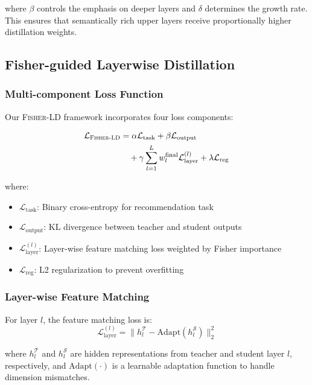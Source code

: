 \documentclass[10pt,conference]{IEEEtran}
\newcommand{\loss}{\mathcal{L}}
\newcommand{\student}{\mathcal{S}}
\newcommand{\teacher}{\mathcal{T}}
\newcommand{\fisherld}{\textsc{Fisher-LD}}
\begin{document}
where $\beta$ controls the emphasis on deeper layers and $\delta$ determines the growth rate. This ensures that semantically rich upper layers receive proportionally higher distillation weights.

\subsection{Fisher-guided Layerwise Distillation}

\subsubsection{Multi-component Loss Function}

Our \fisherld{} framework incorporates four loss components:

\begin{align}
\loss_{\fisherld} &= \alpha \loss_{\text{task}} + \beta \loss_{\text{output}} \nonumber \\
&\quad + \gamma \sum_{l=1}^L w_l^{\text{final}} \loss_{\text{layer}}^{(l)} + \lambda \loss_{\text{reg}}
\end{align}

where:
\begin{itemize}[leftmargin=*]
    \item $\loss_{\text{task}}$: Binary cross-entropy for recommendation task
    \item $\loss_{\text{output}}$: KL divergence between teacher and student outputs
    \item $\loss_{\text{layer}}^{(l)}$: Layer-wise feature matching loss weighted by Fisher importance
    \item $\loss_{\text{reg}}$: L2 regularization to prevent overfitting
\end{itemize}

\subsubsection{Layer-wise Feature Matching}

For layer $l$, the feature matching loss is:
\begin{equation}
\loss_{\text{layer}}^{(l)} = \|h_l^{\teacher} - \text{Adapt}(h_l^{\student})\|_2^2
\end{equation}

where $h_l^{\teacher}$ and $h_l^{\student}$ are hidden representations from teacher and student layer $l$, respectively, and $\text{Adapt}(\cdot)$ is a learnable adaptation function to handle dimension mismatches.
\end{document}
